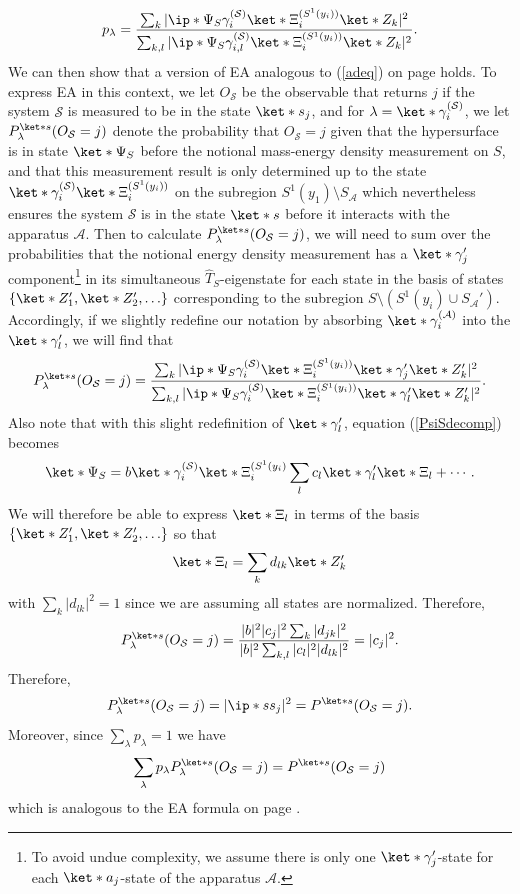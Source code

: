 \documentclass[12pt]{report}
\begin{document}
\begin{equation}\label{plambda}
p_{\lambda}=\frac{\sum_k |\ip*{\Psi_S}{\gamma_i^{(\mathcal{S})}}\ket*{\Xi_i^{(S^1(y_i))}}\ket*{Z_k}|^2}{\sum_{k,l} |\ip*{\Psi_S}{\gamma_{i,l}^{(\mathcal{S})}}\ket*{\Xi_i^{(S^1(y_i))}}\ket*{Z_k}|^2}.
\end{equation}
We can then show that a version of EA analogous to (\ref{adeq}) on page \pageref{adeq} holds. To express EA in this context, we let
$O_{\mathcal{S}}$ %
%
 be the observable that returns $j$ if the system $\mathcal{S}$ is measured to be in the state $\ket*{s_j}$, and for $\lambda = \ket*{\gamma_i^{(\mathcal{S})}}$, we let $P_\lambda^{\ket*{s}}(O_{\mathcal{S}}=j)$ denote the probability that $O_{\mathcal{S}}=j$ given that the hypersurface is in state $\ket*{\Psi_S}$ before the notional mass-energy density measurement on $S$, and that this measurement result is only determined up to the state $\ket*{\gamma_i^{(\mathcal{S})}}\ket*{\Xi_i^{(S^1(y_i))}}$ on the subregion $S^1(y_1)\setminus S_{\mathcal{A}}$ which nevertheless ensures the system $\mathcal{S}$ is in the  state $\ket*{s}$ before it interacts with the apparatus $\mathcal{A}$. Then to calculate $P_\lambda^{\ket*{s}}(O_{\mathcal{S}}=j)$, we will need to sum over the probabilities that the notional energy density measurement has a $\ket*{\gamma_j'}$ component\footnote{To avoid undue complexity, we assume there is only one $\ket*{\gamma_j'}$-state for each $\ket*{a_j}$-state of the apparatus $\mathcal{A}$.} in its simultaneous $\hat{T}_S$-eigenstate for each state in the basis of states  $\{\ket*{Z_1'},\ket*{Z_2'},\ldots\}$ %
  corresponding to the subregion $S\setminus(S^{1}(y_i)\cup S_{\mathcal{A}}')$. Accordingly, if we slightly redefine our notation by absorbing $\ket*{\gamma_i^{(\mathcal{A})}}$ into the $\ket*{\gamma_l'}$, we will find that   
$$P_\lambda^{\ket*{s}}(O_{\mathcal{S}}=j)=\frac{\sum_k|\ip*{\Psi_S}{\gamma_i^{(\mathcal{S})}}\ket*{\Xi_i^{(S^1(y_i))}}\ket*{\gamma_j'}\ket*{Z_k'}|^2}{\sum_{k,l}|\ip*{\Psi_S}{\gamma_i^{(\mathcal{S})}}\ket*{\Xi_i^{(S^1(y_i))}}\ket*{\gamma_l'}\ket*{Z_k'}|^2}.$$ 
Also note that with this slight redefinition of $\ket*{\gamma_l'}$,  equation (\ref{PsiSdecomp}) becomes
$$\ket*{\Psi_S}=b\ket*{\gamma_i^{(\mathcal{S})}}\ket*{\Xi_i^{(S^1(y_i)}}\sum_lc_l\ket*{\gamma_l'}\ket*{\Xi_l}+\cdots.$$
We will therefore be able to express
$\ket*{\Xi_l}$ in terms of the basis $\{\ket*{Z_1'}, \ket*{Z_2'},\ldots  \}$ so that 
$$\ket*{\Xi_l}= \sum_k d_{lk}\ket*{Z_k'}$$
with $\sum_{k}|d_{lk}|^2=1$ since we are assuming all states are normalized. Therefore,
$$P_\lambda^{\ket*{s}}(O_{\mathcal{S}}=j)=\frac{|b|^2|c_j|^2\sum_k |d_{jk}|^2}{|b|^2\sum_{k,l} |c_l|^2 |d_{lk}|^2}= |c_j|^2.$$
Therefore, $$P_\lambda^{\ket*{s}}(O_{\mathcal{S}}=j)=|\ip*{s}{s_j}|^2=P^{\ket*{s}}(O_{\mathcal{S}}=j).$$ Moreover, since $\sum_\lambda p_\lambda =1$ we have 
$$\sum_\lambda p_\lambda P_\lambda^{\ket*{s}}(O_{\mathcal{S}}=j)= P^{\ket*{s}}(O_{\mathcal{S}}=j)$$
which is analogous to the EA formula on page \pageref{adeq}.
\end{document}
